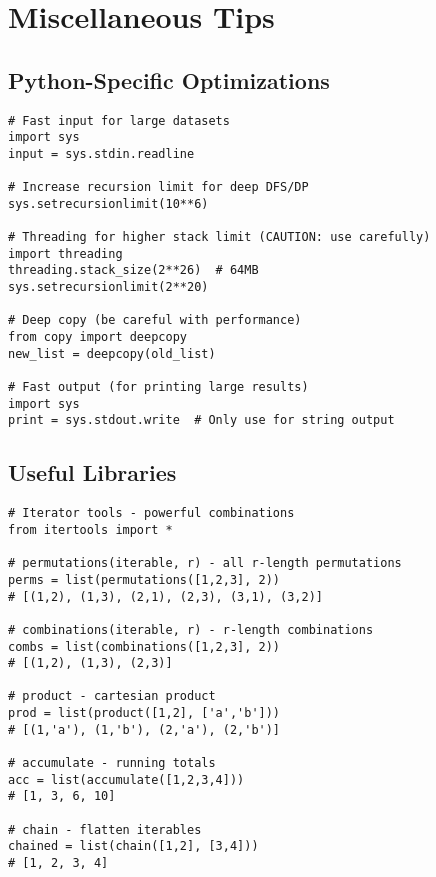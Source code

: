 \section{Miscellaneous Tips}

\subsection{Python-Specific Optimizations}
\begin{lstlisting}
# Fast input for large datasets
import sys
input = sys.stdin.readline

# Increase recursion limit for deep DFS/DP
sys.setrecursionlimit(10**6)

# Threading for higher stack limit (CAUTION: use carefully)
import threading
threading.stack_size(2**26)  # 64MB
sys.setrecursionlimit(2**20)

# Deep copy (be careful with performance)
from copy import deepcopy
new_list = deepcopy(old_list)

# Fast output (for printing large results)
import sys
print = sys.stdout.write  # Only use for string output
\end{lstlisting}

\subsection{Useful Libraries}
\begin{lstlisting}
# Iterator tools - powerful combinations
from itertools import *

# permutations(iterable, r) - all r-length permutations
perms = list(permutations([1,2,3], 2))
# [(1,2), (1,3), (2,1), (2,3), (3,1), (3,2)]

# combinations(iterable, r) - r-length combinations
combs = list(combinations([1,2,3], 2))
# [(1,2), (1,3), (2,3)]

# product - cartesian product
prod = list(product([1,2], ['a','b']))
# [(1,'a'), (1,'b'), (2,'a'), (2,'b')]

# accumulate - running totals
acc = list(accumulate([1,2,3,4]))
# [1, 3, 6, 10]

# chain - flatten iterables
chained = list(chain([1,2], [3,4]))
# [1, 2, 3, 4]
\end{lstlisting}

